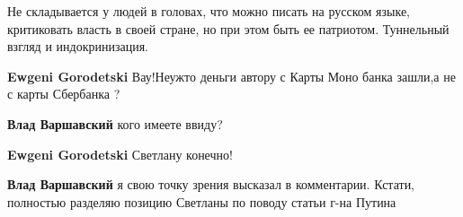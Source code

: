 \begin{itemize}
 

Не складывается у людей в головах, что можно писать на русском языке,
критиковать власть в своей стране, но при этом быть ее патриотом. Туннельный
взгляд и индокринизация.

\begin{itemize}
 
\textbf{Ewgeni Gorodetski} Вау!Неужто деньги автору с Карты Моно банка зашли,а не с карты Сбербанка ?

 
\textbf{Влад Варшавский} кого имеете ввиду?

 
\textbf{Ewgeni Gorodetski} Светлану конечно!

 
\textbf{Влад Варшавский} я свою точку зрения высказал в комментарии. Кстати, полностью разделяю позицию Светланы по поводу статьи г-на Путина

 

\end{itemize}
\end{itemize}
